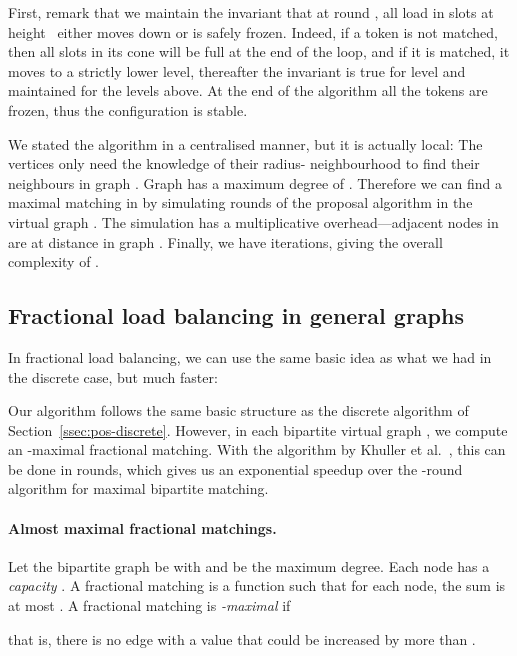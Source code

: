 First, remark that we maintain the invariant that at round , all load in slots at height~ either moves down or is safely frozen.  Indeed, if a token is not matched, then all slots in its cone will be full at the end of the loop, and if it is matched, it moves to a strictly lower level, thereafter the invariant is true for level  and maintained for the levels above. At the end of the algorithm all the tokens are frozen, thus the configuration is stable.

We stated the algorithm in a centralised manner, but it is actually local: The vertices only need the knowledge of their radius- neighbourhood to find their neighbours in graph . Graph  has a maximum degree of . Therefore we can find a maximal matching in  by simulating  rounds of the proposal algorithm \cite{hanckowiak98distributed} in the virtual graph . The simulation has a multiplicative  overhead---adjacent nodes in  are at distance  in graph . Finally, we have  iterations, giving the overall complexity of .


\subsection{Fractional load balancing in general graphs}\label{ssec:pos-fractional}

In fractional load balancing, we can use the same basic idea as what we had in the discrete case, but much faster:

\thmposfractional*

Our algorithm follows the same basic structure as the discrete algorithm of Section~\ref{ssec:pos-discrete}. However, in each bipartite virtual graph , we compute an -maximal fractional matching. With the algorithm by Khuller et al.~\cite{khuller94primal-dual}, this can be done in  rounds, which gives us an exponential speedup over the -round algorithm for maximal bipartite matching.

\paragraph{Almost maximal fractional matchings.}

Let the bipartite graph be  with  and  be the maximum degree. Each node has a \emph{capacity} . A fractional matching is a function  such that for each node, the sum  is at most . A fractional matching is \emph{-maximal} if

that is, there is no edge  with a value  that could be increased by more than .


